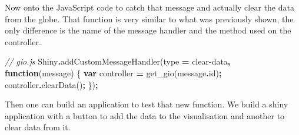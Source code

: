 \documentclass[
]{krantz}
\makeatletter
\newenvironment{Shaded}{\begin{snugshade}}{\end{snugshade}}
\newcommand{\AttributeTok}[1]{\textcolor[rgb]{0.61,0.61,0.61}{#1}}
\newcommand{\CommentTok}[1]{\textcolor[rgb]{0.37,0.37,0.37}{\textit{#1}}}
\newcommand{\FunctionTok}[1]{\textcolor[rgb]{0,0,0}{#1}}
\newcommand{\KeywordTok}[1]{\textcolor[rgb]{0.27,0.27,0.27}{\textbf{#1}}}
\newcommand{\NormalTok}[1]{#1}
\newcommand{\OperatorTok}[1]{\textcolor[rgb]{0.43,0.43,0.43}{\textbf{#1}}}
\newcommand{\StringTok}[1]{\textcolor[rgb]{0.5,0.5,0.5}{#1}}
\newenvironment{kframe}{%
\medskip{}
\setlength{\fboxsep}{.8em}
 \def\at@end@of@kframe{}%
 \ifinner\ifhmode%
  \def\at@end@of@kframe{\end{minipage}}%
  \begin{minipage}{\columnwidth}%
 \fi\fi%
 \def\FrameCommand##1{\hskip\@totalleftmargin \hskip-\fboxsep
 \colorbox{shadecolor}{##1}\hskip-\fboxsep
     \hskip-\linewidth \hskip-\@totalleftmargin \hskip\columnwidth}%
 \MakeFramed {\advance\hsize-\width
   \@totalleftmargin\z@ \linewidth\hsize
   \@setminipage}}%
 {\par\unskip\endMakeFramed%
 \at@end@of@kframe}
\renewenvironment{Shaded}{\begin{kframe}}{\end{kframe}}
\makeatother
\begin{document}
Now onto the JavaScript code to catch that message and actually clear the data from the globe. That function is very similar to what was previously shown, the only difference is the name of the message handler and the method used on the controller.

\begin{Shaded}
\begin{Highlighting}[]
\CommentTok{// gio.js}
\NormalTok{Shiny}\OperatorTok{.}\FunctionTok{addCustomMessageHandler}\NormalTok{(type }\OperatorTok{=} \StringTok{\textquotesingle{}clear{-}data\textquotesingle{}}\OperatorTok{,} \KeywordTok{function}\NormalTok{(message) \{}
  \KeywordTok{var}\NormalTok{ controller }\OperatorTok{=}\NormalTok{ get\_gio(message}\OperatorTok{.}\AttributeTok{id}\NormalTok{)}\OperatorTok{;}
\NormalTok{  controller}\OperatorTok{.}\FunctionTok{clearData}\NormalTok{()}\OperatorTok{;}
\NormalTok{\})}\OperatorTok{;}
\end{Highlighting}
\end{Shaded}

Then one can build an application to test that new function. We build a shiny application with a button to add the data to the visualisation and another to clear data from it.
\end{document}
